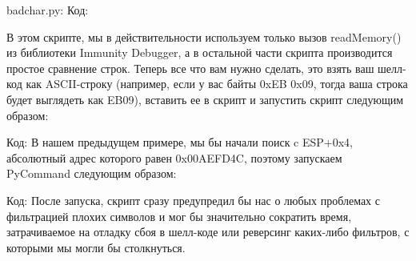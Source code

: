 \documentclass[12pt]{book}
\begin{document}
badchar.py:
Код:













В этом скрипте, мы в действительности используем только вызов readMemory() из библиотеки Immunity Debugger, а в остальной части скрипта производится простое сравнение строк. Теперь все что вам нужно сделать, это взять ваш шелл-код как ASCII-строку (например, если у вас байты 0xEB 0x09, тогда ваша строка будет выглядеть как EB09), вставить ее в скрипт и запустить скрипт следующим образом:

Код:
В нашем предыдущем примере, мы бы начали поиск c ESP+0x4, абсолютный адрес которого равен 0x00AEFD4C, поэтому запускаем PyCommand следующим образом:

Код:
После запуска, скрипт сразу предупредил бы нас о любых проблемах с фильтрацией плохих символов и мог бы значительно сократить время, затрачиваемое на отладку сбоя в шелл-коде или реверсинг каких-либо фильтров, с которыми мы могли бы столкнуться.
\end{document}
